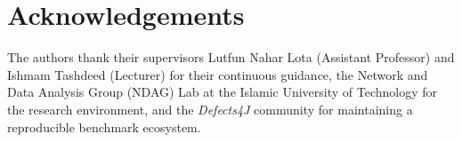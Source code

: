 \section*{Acknowledgements}

The authors thank their supervisors Lutfun Nahar Lota (Assistant Professor) and
Ishmam Tashdeed (Lecturer) for their continuous guidance, the Network and Data
Analysis Group (NDAG) Lab at the Islamic University of Technology for the research
environment, and the \textit{Defects4J} community for maintaining a reproducible
benchmark ecosystem.

